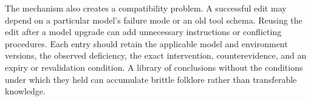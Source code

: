 The mechanism also creates a compatibility problem. A successful edit may depend on a particular model's failure mode or an old tool schema. Reusing the edit after a model upgrade can add unnecessary instructions or conflicting procedures. Each entry should retain the applicable model and environment versions, the observed deficiency, the exact intervention, counterevidence, and an expiry or revalidation condition. A library of conclusions without the conditions under which they held can accumulate brittle folklore rather than transferable knowledge.

